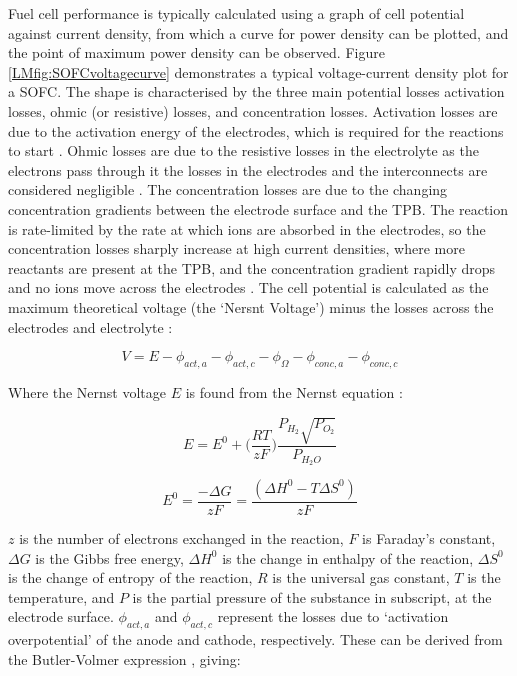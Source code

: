 \documentclass{article}
\begin{document}
    
    Fuel cell performance is typically calculated using a graph of cell potential against current density, from which a curve for power density can be plotted, and the point of maximum power density can be observed. Figure \ref{LMfig:SOFCvoltagecurve} demonstrates a typical voltage-current density plot for a SOFC. The shape is characterised by the three main potential losses \text{-} activation losses, ohmic (or resistive) losses, and concentration losses. Activation losses are due to the activation energy of the electrodes, which is required for the reactions to start \cite{LM2}. Ohmic losses are due to the resistive losses in the electrolyte as the electrons pass through it \text{-} the losses in the electrodes and the interconnects are considered negligible \cite{LM4}. The concentration losses are due to the changing concentration gradients between the electrode surface and the TPB. The reaction is rate-limited by the rate at which ions are absorbed in the electrodes, so the concentration losses sharply increase at high current densities, where more reactants are present at the TPB, and the concentration gradient rapidly drops and no ions move across the electrodes \cite{LM2}.
 The cell potential is calculated as the maximum theoretical voltage (the `Nersnt Voltage') minus the losses across the electrodes and electrolyte \cite{LM5}:
 
\begin{equation}
    V=E- \phi_{act,a} - \phi_{act,c}-  \phi_{\Omega}- \phi_{conc,a} -  \phi_{conc,c}
\end{equation}

Where the Nernst voltage $E$ is found from the Nernst equation \cite{LM2}:

\begin{equation}
E= E^0+  \Big (\frac{RT}{zF} \Big )  \frac{P_{H_{2}} \sqrt{P_{O_{2}} }}{P_{H_{2}O} }			
\end{equation}


\begin{equation}
E^0=  \frac{-\Delta G}{zF} =  \frac{(\Delta H^0-T \Delta S^0)}{zF} 					
\end{equation}

$z$ is the number of electrons exchanged in the reaction, $F$ is Faraday's constant, $\Delta G$ is the Gibbs free energy, $\Delta H^{0}$ is the change in enthalpy of the reaction, $\Delta S^{0}$ is the change of entropy of the reaction, $R$ is the universal gas constant, $T$ is the temperature, and $P$ is the partial pressure of the substance in subscript, at the electrode surface. 
$\phi_{act,a}$ and $\phi_{act,c}$ represent the losses due to `activation overpotential' of the anode and cathode, respectively. These can be derived from the Butler-Volmer expression \cite{LM3}, giving:
\end{document}
